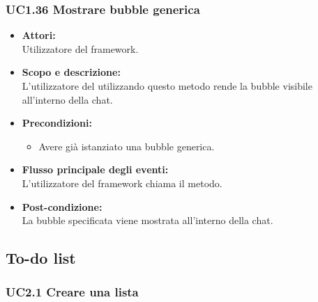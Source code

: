 \subsubsection{UC1.36 Mostrare bubble generica} \label{UC1.36}

\begin{itemize}
	\item \textbf{Attori:}
	\\Utilizzatore del framework.
	\item \textbf{Scopo e descrizione:} 
	\\L’utilizzatore del  utilizzando questo metodo rende la bubble visibile all'interno della chat.
	\item \textbf{Precondizioni:}
	\begin{itemize}
		\item Avere già istanziato una bubble generica.
	\end{itemize}
	\item \textbf{Flusso principale degli eventi:}
	\\L’utilizzatore del framework chiama il metodo.
	\item \textbf{Post-condizione:}
	\\La bubble specificata viene mostrata all'interno della chat.
\end{itemize}

\subsection{To-do list}

\subsubsection{UC2.1 Creare una lista} \label{UC2.1}

